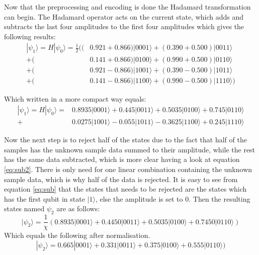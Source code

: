 \documentclass[../main.tex]{subfiles}
\begin{document}
Now that the preprocessing and encoding is done the Hadamard transformation can begin. The Hadamard operator acts on the current state, which adds and subtracts the last four amplitudes to the first four amplitudes which gives the following results:
\begin{equation}
\begin{split}
|\psi_{1}\rangle=H|\psi_{0}\rangle=\frac{1}{2}((&0.921+0.866)|0001\rangle+(0.390+0.500)|0011\rangle\\+(&0.141+0.866)|0100\rangle+(0.990+0.500)|0110\rangle\\+(&0.921-0.866)|1001\rangle
+(0.390-0.500)|1011\rangle\\+(&0.141-0.866)|1100\rangle+(0.990-0.500)|1110\rangle)
\end{split}
\label{eq:sub2}
\end{equation}

Which written in a more compact way equals:
\begin{equation}
\begin{split}
|\psi_{1}\rangle=H|\psi_{0}\rangle=&0.8935|0001\rangle+0.445|0011\rangle
+0.5035|0100\rangle+0.745|0110\rangle\\
+&0.0275|1001\rangle-0.055|1011\rangle
-0.3625|1100\rangle+0.245|1110\rangle
\end{split}
\label{eq:sub}
\end{equation}

Now the next step is to reject half of the states due to the fact that half of the samples has the unknown sample data summed to their amplitude, while the rest has the same data subtracted, which is more clear having a look at equation \eqref{eq:sub2}. There is only need for one linear combination containing the unknown sample data, which is why half of the data is rejected. It is easy to see from equation \eqref{eq:sub} that the states that needs to be rejected are the states which has the first qubit in state \ensuremath{|1\rangle}, else the amplitude is set to 0. Then the resulting states named \ensuremath{\psi_2} are as follows:
\begin{equation}
|\psi_{2}\rangle=\frac{1}{\chi}(0.8935|0001\rangle+0.4450|0011\rangle
+0.5035|0100\rangle+0.7450|0110\rangle)
\end{equation}
Which equals the following after normalisation.
\begin{equation}
|\psi_{2}\rangle=0.665|0001\rangle+0.331|0011\rangle
+0.375|0100\rangle+0.555|0110\rangle)
\end{equation}
\end{document}
